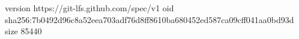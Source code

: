 version https://git-lfs.github.com/spec/v1
oid sha256:7b0492d96c8a52eea703adf76d8ff8610ba680452ed587ca09cff041aa0bd93d
size 85440
